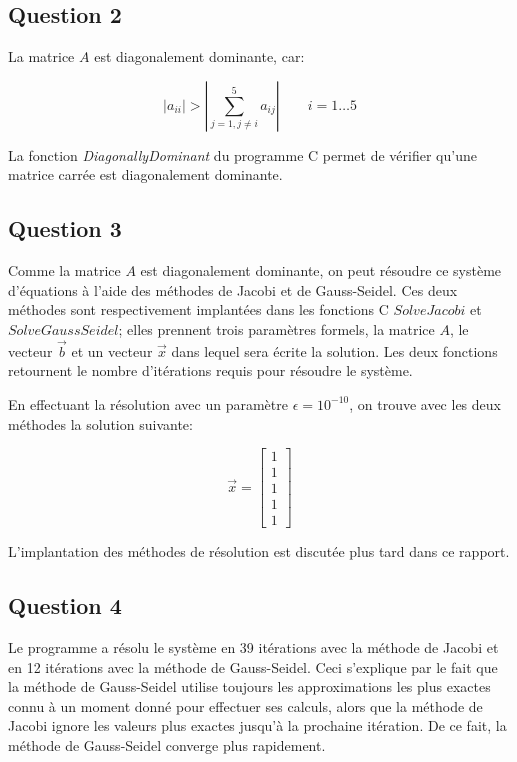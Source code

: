 \documentclass[10pt]{article}
\begin{document}
\subsection{Question 2}

La matrice $A$ est diagonalement dominante, car:

\[
|a_{ii}| > \left|\sum_{j=1, j \ne i}^5a_{ij}\right| \quad\quad i=1\ldots 5
\]

La fonction \emph{DiagonallyDominant} du programme C permet de
vérifier qu'une matrice carrée est diagonalement dominante.

\subsection{Question 3}

Comme la matrice $A$ est diagonalement dominante, on peut résoudre ce
système d'équations à l'aide des méthodes de Jacobi et de
Gauss-Seidel.  Ces deux méthodes sont respectivement implantées dans
les fonctions C $SolveJacobi$ et $SolveGaussSeidel$; elles prennent
trois paramètres formels, la matrice $A$, le vecteur $\vec{b}$ et un
vecteur $\vec{x}$ dans lequel sera écrite la solution.  Les deux
fonctions retournent le nombre d'itérations requis pour résoudre le
système.

En effectuant la résolution avec un paramètre $\epsilon = 10^{-10}$,
on trouve avec les deux méthodes la solution suivante:

\[
\vec{x} = \begin{bmatrix}
  1 \\ 1 \\ 1 \\ 1 \\ 1
\end{bmatrix}
\]

L'implantation des méthodes de résolution est discutée plus tard dans
ce rapport.

\subsection{Question 4}

Le programme a résolu le système en 39 itérations avec la méthode de
Jacobi et en 12 itérations avec la méthode de Gauss-Seidel.  Ceci
s'explique par le fait que la méthode de Gauss-Seidel utilise toujours
les approximations les plus exactes connu à un moment donné pour
effectuer ses calculs, alors que la méthode de Jacobi ignore les
valeurs plus exactes jusqu'à la prochaine itération. De ce fait, la
méthode de Gauss-Seidel converge plus rapidement.
\end{document}
